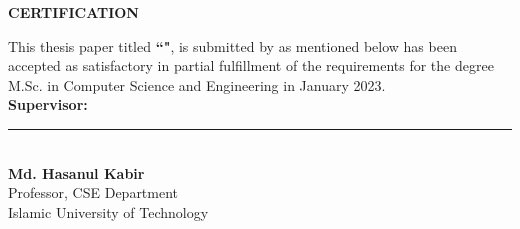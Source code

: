 \begin{center}
  \textbf{{\Large CERTIFICATION}}\\[60pt]
\end{center}

This thesis paper titled \textbf{``"}, is submitted by  as mentioned below has been accepted as satisfactory in partial fulfillment of the requirements for the degree M.Sc. in Computer Science and Engineering in January 2023.\\


\textbf{Supervisor:}


\rule[1em]{15em}{0.5pt}\\
\textbf{Md. Hasanul Kabir}\\
Professor, CSE Department\\
Islamic University of Technology

